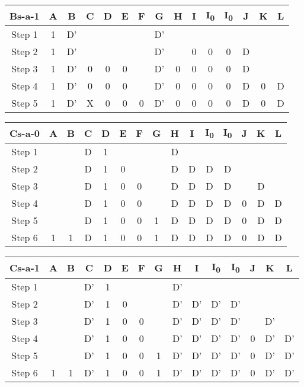 \documentclass[11pt]{report}
\begin{document}
\begin{tabular}{ |c||c|c|c|c|c|c|c|c|c|c|c|c|c|c| }
\hline
\bf Bs-a-1 & \bf A & \bf B & \bf C & \bf D & \bf E & \bf F & G & H & I & I\textsubscript{0} & I\textsubscript{0} & J & K & \bf L \\
\hline
\hline
Step 1 & 1 & D' & & & & & D' & & & & & & & \\
\hline
Step 2 & 1 & D' & & & & & D' & & 0 & 0 & 0 & D & & \\
\hline
Step 3 & 1 & D' & 0 & 0 & 0 & & D' & 0 & 0 & 0 & 0 & D & & \\
\hline
Step 4 & 1 & D' & 0 & 0 & 0 & & D' & 0 & 0 & 0 & 0 & D & 0 & D \\
\hline
Step 5 & 1 & D' & X & 0 & 0 & 0 & D' & 0 & 0 & 0 & 0 & D & 0 & D \\
\hline
\end{tabular}




\begin{tabular}{ |c||c|c|c|c|c|c|c|c|c|c|c|c|c|c| }
\hline
\bf Cs-a-0 & \bf A & \bf B & \bf C & \bf D & \bf E & \bf F & G & H & I & I\textsubscript{0} & I\textsubscript{0} & J & K & \bf L \\
\hline
\hline
Step 1 & & & D & 1 & & & & D & & & & & & \\
\hline
Step 2 & & & D & 1 & 0 & & & D & D & D & D & & & \\
\hline
Step 3 & & & D & 1 & 0 & 0 & & D & D & D & D & & D & \\
\hline
Step 4 & & & D & 1 & 0 & 0 & & D & D & D & D & 0 & D & D \\
\hline
Step 5 & & & D & 1 & 0 & 0 & 1 & D & D & D & D & 0 & D & D \\
\hline
Step 6 & 1 & 1 & D & 1 & 0 & 0 & 1 & D & D & D & D & 0 & D & D \\
\hline
\end{tabular}




\begin{tabular}{ |c||c|c|c|c|c|c|c|c|c|c|c|c|c|c| }
\hline
\bf Cs-a-1 & \bf A & \bf B & \bf C & \bf D & \bf E & \bf F & G & H & I & I\textsubscript{0} & I\textsubscript{0} & J & K & \bf L \\
\hline
\hline
Step 1 & & & D' & 1 & & & & D' & & & & & & \\
\hline
Step 2 & & & D' & 1 & 0 & & & D' & D' & D' & D' & & & \\
\hline
Step 3 & & & D' & 1 & 0 & 0 & & D' & D' & D' & D' & & D' & \\
\hline
Step 4 & & & D' & 1 & 0 & 0 & & D' & D' & D' & D' & 0 & D' & D' \\
\hline
Step 5 & & & D' & 1 & 0 & 0 & 1 & D' & D' & D' & D' & 0 & D' & D' \\
\hline
Step 6 & 1 & 1 & D' & 1 & 0 & 0 & 1 & D' & D' & D' & D' & 0 & D' & D' \\
\hline
\end{tabular}
\end{document}

